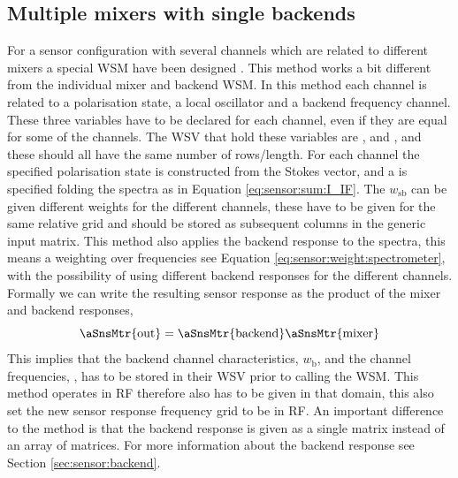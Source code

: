 \subsection{Multiple mixers with single backends}
For a sensor configuration with several channels which are related to
different mixers a special WSM have been designed
.  This method works a
bit different from the individual mixer and backend WSM. In this
method each channel is related to a polarisation state, a local
oscillator and a backend frequency channel. These three variables have
to be declared for each channel, even if they are equal for some of
the channels.
The WSV that hold these variables are ,
 and , and these should all have
the same number of rows/length.  For each channel the specified
polarisation state is constructed from the Stokes vector, and a
 is specified folding the spectra as in
Equation \ref{eq:sensor:sum:I_IF}. The $w_\mathrm{sb}$ can be given
different weights for the different channels, these have to be given
for the same relative grid and should be stored as subsequent columns
in the generic input matrix.  This method also applies the backend
response to the spectra, this means a weighting over frequencies see
Equation \ref{eq:sensor:weight:spectrometer}, with the possibility of
using different backend responses for the different channels. Formally
we can write the resulting sensor response as the product of the mixer
and backend responses,
\begin{equation}
\aSnsMtr{\mathrm{out}} = \aSnsMtr{\mathrm{backend}} \aSnsMtr{\mathrm{mixer}}
\end{equation}
This implies that the backend channel characteristics, $w_\mathrm{b}$,
and the channel frequencies, , has to be stored in
their WSV prior to calling the WSM. This method operates in RF
therefore  also has to be given in that domain, this
also set the new sensor response frequency grid to be in RF. An
important difference to the  method
is that the backend response is given as a single matrix instead of an
array of matrices. For more information about the backend response see
Section \ref{sec:sensor:backend}.

